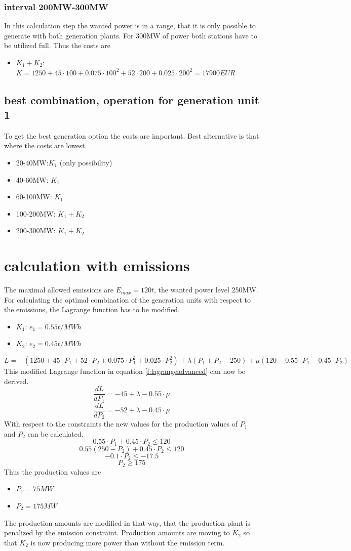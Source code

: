 \documentclass{article}
\begin{document}
	\subsubsection{interval 200MW-300MW}
In this calculation step the wanted power is in a range, that it is only possible to generate with both generation plants. For 300MW of power both stations have to be utilized full. Thus the costs are
	\begin{itemize}
		\item $K_1+K_2$: $K=1250+45\cdot 100+0.075\cdot 100^2 + 52\cdot 200+0.025\cdot 200^2=17900EUR$
	\end{itemize}
	\subsection{best combination, operation for generation unit 1}
		To get the best generation option the costs are important. Best alternative is that where the costs are lowest.
		\begin{itemize}
			\item 20-40MW:$K_1$ (only possibility)
			\item 40-60MW: $K_1$
			\item 60-100MW: $K_1$
			\item 100-200MW: $K_1+K_2$
			\item 200-300MW: $K_1+K_2$
		\end{itemize}

		
	\section{calculation with emissions}
The maximal allowed emissions are $E_{max}=120t$, the wanted power level 250MW. For calculating the optimal combination of the generation units with respect to the emissions, the Lagrange function has to be modified.
	\begin{itemize}
		\item $K_1$: $e_1=0.55t/MWh$
		\item $K_2$: $e_2=0.45t/MWh$
	\end{itemize}
	\begin{equation}
		L=-(1250+45\cdot P_1+52\cdot P_2+0.075\cdot P_1^2+0.025\cdot P_2^2)+\lambda(P_1+P_2-250)+\mu(120-0.55\cdot P_1-0.45\cdot P_2)
		\label{f:lagrangeadvanced}
	\end{equation}
	This modified Lagrange function in equation \ref{f:lagrangeadvanced} can now be derived. 
	$$\frac{dL}{dP_1}=-45+\lambda-0.55\cdot\mu$$
	$$\frac{dL}{dP_2}=-52+\lambda-0.45\cdot\mu$$
	With respect to the constraints the new values for the production values of $P_1$ and $P_2$ can be calculated.
	$$0.55\cdot P_1+0.45\cdot P_2\leq 120$$
	$$0.55(250-P_2)+0.45\cdot P_2\leq 120$$
	$$-0.1\cdot P_2\leq -17.5$$
	$$P_2\geq 175$$
	Thus the production values are
	\begin{itemize}
		\item $P_1=75MW$
		\item $P_2=175MW$
	\end{itemize}
The production amounts are modified in that way, that the production plant is penalized by the emission constraint. Production amounts are moving to $K_2$ so that $K_2$ is now producing more power than without the emission term.
\end{document}
